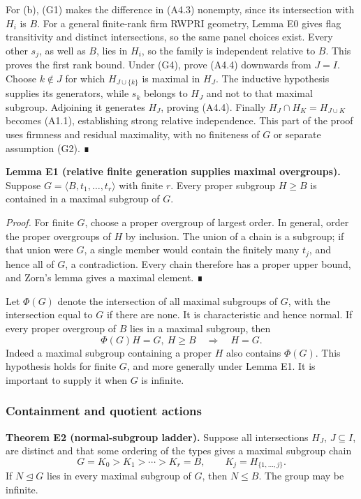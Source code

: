 \documentclass[
  10pt,
  letterpaper,
]{article}
\newcounter{none} %
\begin{document}
For (b), (G1) makes the difference in (A4.3) nonempty, since its
intersection with \(H_i\) is \(B\). For a general finite-rank firm RWPRI
geometry, Lemma E0 gives flag transitivity and distinct intersections,
so the same panel choices exist. Every other \(s_j\), as well as \(B\),
lies in \(H_i\), so the family is independent relative to \(B\). This
proves the first rank bound. Under (G4), prove (A4.4) downwards from
\(J=I\). Choose \(k\notin J\) for which \(H_{J\cup\{k\}}\) is maximal in
\(H_J\). The inductive hypothesis supplies its generators, while \(s_k\)
belongs to \(H_J\) and not to that maximal subgroup. Adjoining it
generates \(H_J\), proving (A4.4). Finally \(H_J\cap H_K=H_{J\cup K}\)
becomes (A1.1), establishing strong relative independence. This part of
the proof uses firmness and residual maximality, with no finiteness of
\(G\) or separate assumption (G2). ∎

\textbf{Lemma E1 (relative finite generation supplies maximal
overgroups).} Suppose \(G=\langle B,t_1,\ldots,t_r\rangle\) with finite
\(r\). Every proper subgroup \(H\geq B\) is contained in a maximal
subgroup of \(G\).

\emph{Proof.} For finite \(G\), choose a proper overgroup of largest
order. In general, order the proper overgroups of \(H\) by inclusion.
The union of a chain is a subgroup; if that union were \(G\), a single
member would contain the finitely many \(t_j\), and hence all of \(G\),
a contradiction. Every chain therefore has a proper upper bound, and
Zorn's lemma gives a maximal element. ∎

Let \(\Phi(G)\) denote the intersection of all maximal subgroups of
\(G\), with the intersection equal to \(G\) if there are none. It is
characteristic and hence normal. If every proper overgroup of \(B\) lies
in a maximal subgroup, then \[
\Phi(G)H=G,\ H\geq B\quad\Longrightarrow\quad H=G.\tag{A6.1}
\] Indeed a maximal subgroup containing a proper \(H\) also contains
\(\Phi(G)\). This hypothesis holds for finite \(G\), and more generally
under Lemma E1. It is important to supply it when \(G\) is infinite.

\subsubsection{Containment and quotient
actions}\label{containment-and-quotient-actions}

\textbf{Theorem E2 (normal-subgroup ladder).} Suppose all intersections
\(H_J\), \(J\subseteq I\), are distinct and that some ordering of the
types gives a maximal subgroup chain \[
G=K_0>K_1>\cdots>K_r=B,\qquad K_j=H_{\{1,\ldots,j\}}.
\tag{A6.2}
\] If \(N\unlhd G\) lies in every maximal subgroup of \(G\), then
\(N\leq B\). The group may be infinite.
\end{document}
